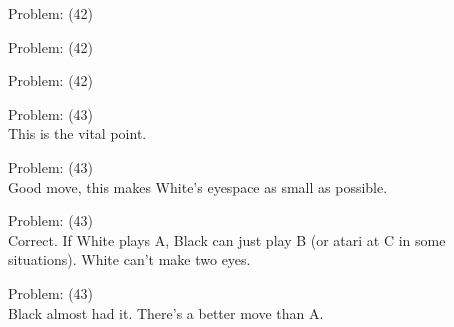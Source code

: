 \documentclass[11pt]{article}
\begin{document}
\begin{minipage}[t]{0.5\textwidth}
  {\centering
  
  Problem: (42)\\
  
  }
\end{minipage}
\begin{minipage}[t]{0.5\textwidth}
  {\centering
  
  Problem: (42)\\
  
  }
\end{minipage}
\begin{minipage}[t]{0.5\textwidth}
  {\centering
  
  Problem: (42)\\
  
  }
\end{minipage}
\begin{minipage}[t]{0.5\textwidth}
  {\centering
  
  Problem: (43)\\
  This is the vital point.\\
  }
\end{minipage}
\begin{minipage}[t]{0.5\textwidth}
  {\centering
  
  Problem: (43)\\
  Good move, this makes White's eyespace as small as possible.\\
  }
\end{minipage}
\begin{minipage}[t]{0.5\textwidth}
  {\centering
  
  Problem: (43)\\
  Correct. If White plays A, Black can just play B (or atari at C in some situations). White can't make two eyes.\\
  }
\end{minipage}
\begin{minipage}[t]{0.5\textwidth}
  {\centering
  
  Problem: (43)\\
  Black almost had it. There's a better move than A.\\
  }
\end{minipage}
\end{document}
